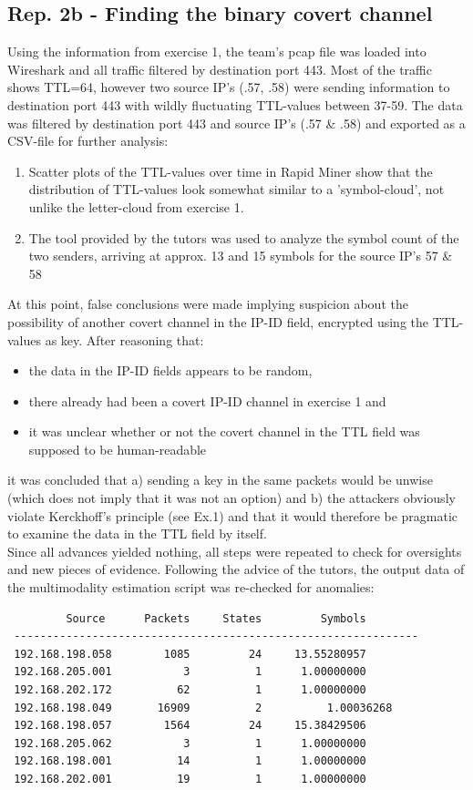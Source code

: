 \documentclass{article}
\begin{document}
\subsection*{Rep. 2b - Finding the binary covert channel}
Using the information from exercise 1, the team's pcap file was loaded into Wireshark and all traffic filtered by destination port 443. Most of the traffic shows TTL=64, however two source IP's (.57, .58) were sending information to destination port 443 with wildly fluctuating TTL-values between 37-59. The data was filtered by destination port 443 and source IP's (.57 \& .58) and exported as a CSV-file for further analysis:
\begin{enumerate}
\item Scatter plots of the TTL-values over time in Rapid Miner show that the distribution of TTL-values look somewhat similar to a 'symbol-cloud', not unlike the letter-cloud from exercise 1.
\item The tool provided by the tutors was used to analyze the symbol count of the two senders, arriving at approx. 13 and 15 symbols for the source IP's 57 \& 58
\end{enumerate}

At this point, false conclusions were made implying suspicion about the possibility of another covert channel in the IP-ID field, encrypted using the TTL-values as key. After reasoning that:
\begin{itemize}
\item the data in the IP-ID fields appears to be random,
\item there already had been a covert IP-ID channel in exercise 1 and
\item it was unclear whether or not the covert channel in the TTL field was supposed to be human-readable
\end{itemize}
it was concluded that a) sending a key in the same packets would be unwise (which does not imply that it was not an option) and b) the attackers obviously violate Kerckhoff's principle (see Ex.1) and that it would therefore be pragmatic to examine the data in the TTL field by itself.\\

Since all advances yielded nothing, all steps were repeated to check for oversights and new pieces of evidence. Following the advice of the tutors, the output data of the multimodality estimation script was re-checked for anomalies:

\begin{verbatim}
         Source		 Packets	 States	        Symbols
 -------------------------------------------------------------- 
 192.168.198.058	    1085	     24	    13.55280957
 192.168.205.001	       3	      1	     1.00000000
 192.168.202.172	      62	      1	     1.00000000
 192.168.198.049	   16909	      2	    	 1.00036268
 192.168.198.057	    1564	     24	    15.38429506
 192.168.205.062	       3	      1	     1.00000000
 192.168.198.001	      14	      1	     1.00000000
 192.168.202.001	      19	      1	     1.00000000
\end{verbatim}
\end{document}
